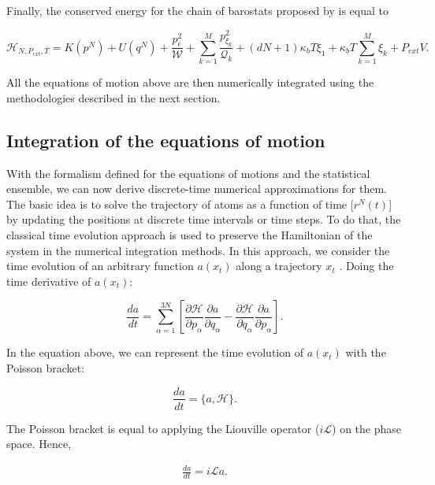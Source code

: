 \documentclass[
	12pt,				%
	openany,			%
	oneside,			%
	a4paper,			%
	english,			%
	brazil				%
	]{abntex2}
\begin{document}
Finally, the conserved energy for the chain of barostats proposed by  is equal to

\begin{equation}
\mathcal{H}_{N,P_{ext},T} =  K(p^{N}) + U(q^{N})  + \frac{p_{\epsilon}^2}{\mathcal{W}}+\sum_{k=1}^{M }\frac{p^{2}_{\xi _{k}}}{\mathcal{Q} _{k}} + (dN+1)\kappa_{b}T \xi _{1}  + \kappa_{b}T\sum_{k=1}^{M}  \xi _{k} + P_{ext}V.
\end{equation}

All the equations of motion above are then numerically integrated using the methodologies described in the next section.

\subsection{Integration of the equations of motion}

With the formalism defined for the equations of motions and the statistical ensemble, we can now derive discrete-time numerical approximations for them.  The basic idea is to solve the trajectory of atoms as a function of time [$r^{N}(t)$] by updating the positions at discrete time intervals or time steps. To do that, the classical time evolution approach is used to preserve the Hamiltonian of the system in the numerical integration methods. In this approach, we consider the time evolution of an arbitrary function $a(x_{t})$ along a trajectory $x_{t}$ \cite{tuckerman}. Doing the time derivative of $a(x_{t})$:

\begin{equation}
\frac{da}{dt} = \sum_{\alpha=1}^{3N} \left [  \dfrac{\partial \mathcal{H}}{\partial p_{\alpha}}\dfrac{\partial a}{\partial q_{\alpha}}  -  \dfrac{\partial \mathcal{H}}{\partial q_{\alpha}} \dfrac{\partial a}{\partial p_{\alpha}} \right].
\label{eqn:operador}
\end{equation}

In the equation above, we can represent the time evolution of $a(x_{t})$ with  the Poisson bracket:

\begin{equation}
\frac{da}{dt} = \{a,\mathcal{H}\}.
\end{equation}

The Poisson bracket is equal to applying the Liouville operator ($i\mathcal{L}$) on the phase space. Hence,

\begin{equation}
\begin{aligned}
\frac{da}{dt} = i\mathcal{L} a .
\end{aligned}
\label{eqn:liou}
\end{equation}
\end{document}
